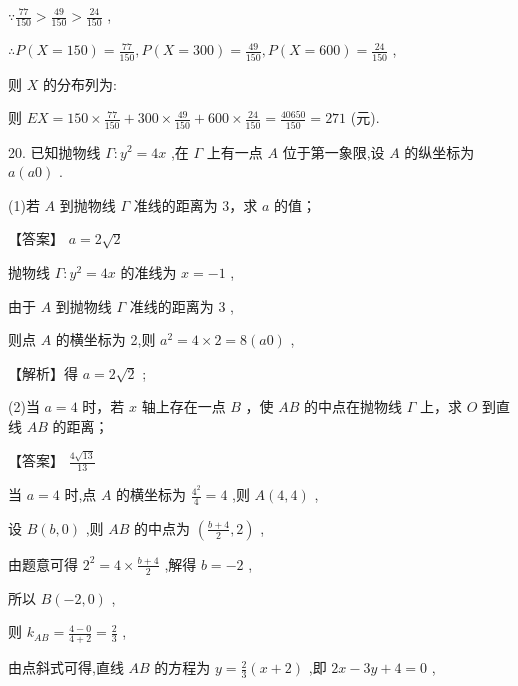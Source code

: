 \documentclass[10pt]{article}
\begin{document}
\(\because \frac{77}{150} > \frac{49}{150} > \frac{24}{150}\) ,

\(\therefore P\left( {X = {150}}\right)  = \frac{77}{150},P\left( {X = {300}}\right)  = \frac{49}{150},P\left( {X = {600}}\right)  = \frac{24}{150}\) ,

则 \(X\) 的分布列为:

\begin{center}
\end{center}

则 \({EX} = {150} \times  \frac{77}{150} + {300} \times  \frac{49}{150} + {600} \times  \frac{24}{150} = \frac{40650}{150} = {271}\) (元).

20. 已知抛物线 \(\Gamma  : {y}^{2} = {4x}\) ,在 \(\Gamma\) 上有一点 \(A\) 位于第一象限,设 \(A\) 的纵坐标为 \(a\left( {a0}\right)\) .

(1)若 \(A\) 到抛物线 \(\Gamma\) 准线的距离为 3，求 \(a\) 的值；

【答案】 \(a = 2\sqrt{2}\)

抛物线 \(\Gamma  : {y}^{2} = {4x}\) 的准线为 \(x =  - 1\) ,

由于 \(A\) 到抛物线 \(\Gamma\) 准线的距离为 3 ,

则点 \(A\) 的横坐标为 2,则 \({a}^{2} = 4 \times  2 = 8\left( {a0}\right)\) ,

【解析】得 \(a = 2\sqrt{2}\) ;

(2)当 \(a = 4\) 时，若 \(x\) 轴上存在一点 \(B\) ，使 \({AB}\) 的中点在抛物线 \(\Gamma\) 上，求 \(O\) 到直线 \({AB}\) 的距离；

【答案】 \(\frac{4\sqrt{13}}{13}\)

当 \(a = 4\) 时,点 \(A\) 的横坐标为 \(\frac{{4}^{2}}{4} = 4\) ,则 \(A\left( {4,4}\right)\) ,

设 \(B\left( {b,0}\right)\) ,则 \({AB}\) 的中点为 \(\left( {\frac{b + 4}{2},2}\right)\) ,

由题意可得 \({2}^{2} = 4 \times  \frac{b + 4}{2}\) ,解得 \(b =  - 2\) ,

所以 \(B\left( {-2,0}\right)\) ,

则 \({k}_{AB} = \frac{4 - 0}{4 + 2} = \frac{2}{3}\) ,

由点斜式可得,直线 \({AB}\) 的方程为 \(y = \frac{2}{3}\left( {x + 2}\right)\) ,即 \({2x} - {3y} + 4 = 0\) ,
\end{document}
